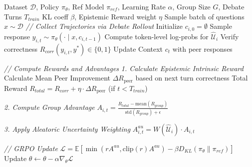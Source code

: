\documentclass{article}
\theoremstyle{plain}
\theoremstyle{definition}
\theoremstyle{remark}
\begin{document}
\begin{algorithm}[tb]
   \caption{Uncertainty-Guided Multi-Agent Debate Training (UMAD)}
   \label{alg:umad_training}
\begin{algorithmic}[1]
    Dataset $\mathcal{D}$, Policy $\pi_{\theta}$, Ref Model $\pi_{ref}$, Learning Rate $\alpha$, Group Size $G$, Debate Turns $T_{train}$
    KL coeff $\beta$, Epistemic Reward weight $\eta$
       \STATE Sample batch of questions $x \sim \mathcal{D}$
           \STATE \emph{// Collect Trajectories via Debate Rollout}
               \STATE Initialize $c_{i,0} = \emptyset$
                       \STATE Sample response $y_{i,t} \sim \pi_{\theta}(\cdot \mid x, c_{i,t-1})$
                       \STATE Compute token-level log-probs for $\hat{\mathcal{U}}_i$
                       \STATE Verify correctness $R_{corr}(y_{i,t}, y^*) \in \{0, 1\}$
                   \ENDFOR
                   \STATE Update Context $c_{t}$ with peer responses
               \ENDFOR
           \ENDFOR
           
           \STATE \emph{// Compute Rewards and Advantages}
               \STATE \emph{1. Calculate Epistemic Intrinsic Reward}
               \STATE Calculate Mean Peer Improvement $\Delta R_{\text{peer}}$ based on next turn correctness
               \STATE Total Reward $R_{total} = R_{corr} + \eta \cdot \Delta R_{\text{peer}}$ (if $t < T_{train}$)
               
               \STATE \emph{2. Compute Group Advantage}
               \STATE $A_{i,t} = \frac{R_{total} - \text{mean}(R_{group})}{\text{std}(R_{group}) + \epsilon}$
               
               \STATE \emph{3. Apply Aleatoric Uncertainty Weighting}
               \STATE $A^{au}_{i,t} = W(\hat{\mathcal{U}}_i) \cdot A_{i,t}$
           \ENDFOR
           
           \STATE \emph{// GRPO Update}
           \STATE $\mathcal{L} = \mathbb{E} \left[ \min(r A^{au}, \text{clip}(r) A^{au}) - \beta D_{KL}(\pi_\theta \| \pi_{ref}) \right]$
           \STATE Update $\theta \leftarrow \theta - \alpha \nabla_\theta \mathcal{L}$
       \ENDFOR
   \ENDWHILE
\end{algorithmic}
\end{algorithm}
\end{document}
